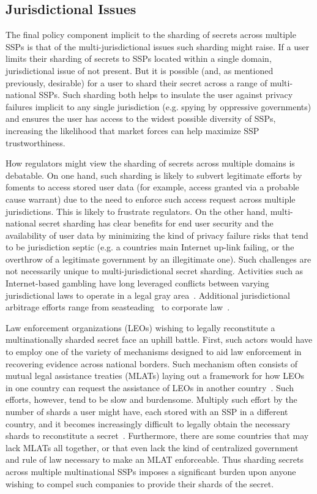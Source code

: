 \subsection{Jurisdictional Issues}
\label{chap:policy:trust:jurisdiction}

The final policy component implicit to the sharding of secrets across
multiple SSPs is that of the multi-jurisdictional issues such sharding
might raise. If a user limits their sharding of secrets to SSPs
located within a single domain, jurisdictional issue of not
present. But it is possible (and, as mentioned previously, desirable)
for a user to shard their secret across a range of multi-national
SSPs. Such sharding both helps to insulate the user against privacy
failures implicit to any single jurisdiction (e.g. spying by
oppressive governments) and ensures the user has access to the widest
possible diversity of SSPs, increasing the likelihood that market
forces can help maximize SSP trustworthiness.

How regulators might view the sharding of secrets across multiple
domains is debatable. On one hand, such sharding is likely to subvert
legitimate efforts by foments to access stored user data (for example,
access granted via a probable cause warrant) due to the need to
enforce such access request across multiple jurisdictions. This is
likely to frustrate regulators. On the other hand, multi-national
secret sharding has clear benefits for end user security and the
availability of user data by minimizing the kind of privacy failure
risks that tend to be jurisdiction septic (e.g. a countries main
Internet up-link failing, or the overthrow of a legitimate government
by an illegitimate one). Such challenges are not necessarily unique to
multi-jurisdictional secret sharding. Activities such as
Internet-based gambling have long leveraged conflicts between varying
jurisdictional laws to operate in a legal gray
area~\cite{miller2006}. Additional jurisdictional arbitrage efforts
range from seasteading~\cite{balloun2012} to corporate
law~\cite{kocaoglu2008}.

Law enforcement organizations (LEOs) wishing to legally reconstitute a
multinationally sharded secret face an uphill battle. First, such
actors would have to employ one of the variety of mechanisms designed
to aid law enforcement in recovering evidence across national
borders. Such mechanism often consists of mutual legal assistance
treaties (MLATs) laying out a framework for how LEOs in one country
can request the assistance of LEOs in another
country~\cite{stigall2013, walden2011}. Such efforts, however, tend to
be slow and burdensome. Multiply such effort by the number of shards a
user might have, each stored with an SSP in a different country, and
it becomes increasingly difficult to legally obtain the necessary
shards to reconstitute a secret~\cite{kent2015}. Furthermore, there
are some countries that may lack MLATs all together, or that even lack
the kind of centralized government and rule of law necessary to make
an MLAT enforceable. Thus sharding secrets across multiple
multinational SSPs imposes a significant burden upon anyone wishing to
compel such companies to provide their shards of the secret.

